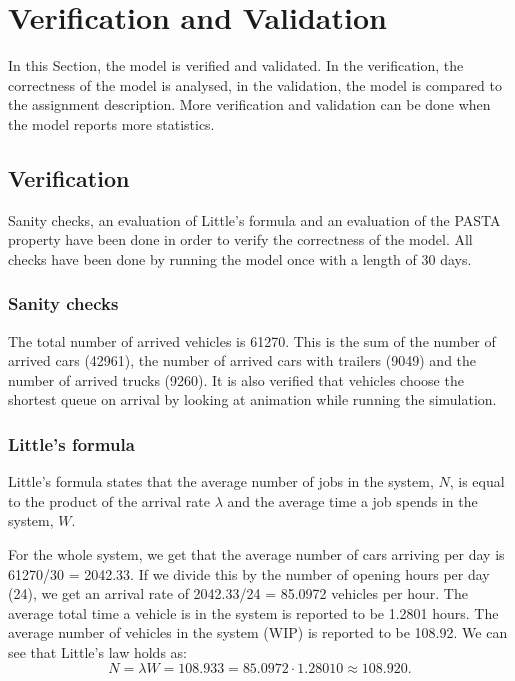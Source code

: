 \section{Verification and Validation}

In this Section, the model is verified and validated.
In the verification, the correctness of the model is analysed, in the validation, the model is compared to the assignment description.
More verification and validation can be done when the model reports more statistics.

\subsection{Verification}
Sanity checks, an evaluation of Little's formula and an evaluation of the PASTA property have been done in order to verify the correctness of the model. 
All checks have been done by running the model once with a length of 30 days. 

\subsubsection{Sanity checks}

The total number of arrived vehicles is 61270.
This is the sum of the number of arrived cars (42961), the number of arrived cars with trailers (9049) and the number of arrived trucks (9260).
It is also verified that vehicles choose the shortest queue on arrival by looking at animation while running the simulation.

\subsubsection{Little's formula}
Little's formula states that the average number of jobs in the system, $N$, is equal to the product of the arrival rate $\lambda$ and the average time a job spends in the system, $W$.

For the whole system, we get that the average number of cars arriving per day is 61270/30 = 2042.33. 
If we divide this by the number of opening hours per day (24), we get an arrival rate of 2042.33/24 = 85.0972 vehicles per hour.
The average total time a vehicle is in the system is reported to be 1.2801 hours.
The average number of vehicles in the system (WIP) is reported to be 108.92.
We can see that Little's law holds as:
$$N=\lambda W = 108.933 = 85.0972\cdot1.28010 \approx 108.920.$$

